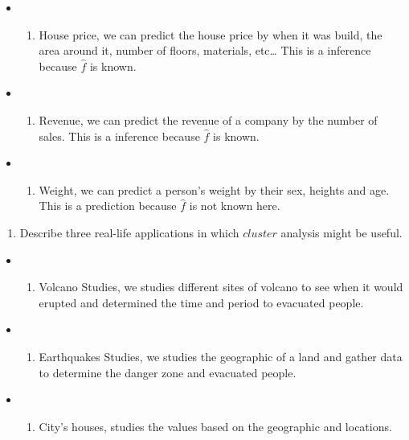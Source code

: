 \documentclass[
]{article}
\providecommand{\tightlist}{%
  \setlength{\itemsep}{0pt}\setlength{\parskip}{0pt}}
\begin{document}
\begin{itemize}
\item
  \begin{enumerate}
  \def\labelenumi{(\arabic{enumi})}
  \tightlist
  \item
    House price, we can predict the house price by when it was build,
    the area around it, number of floors, materials, etc\ldots{} This is
    a inference because \(\hat{f}\) is known.
  \end{enumerate}
\item
  \begin{enumerate}
  \def\labelenumi{(\arabic{enumi})}
  \setcounter{enumi}{1}
  \tightlist
  \item
    Revenue, we can predict the revenue of a company by the number of
    sales. This is a inference because \(\hat{f}\) is known.
  \end{enumerate}
\item
  \begin{enumerate}
  \def\labelenumi{(\arabic{enumi})}
  \setcounter{enumi}{2}
  \tightlist
  \item
    Weight, we can predict a person's weight by their sex, heights and
    age. This is a prediction because \(\hat{f}\) is not known here.
  \end{enumerate}
\end{itemize}

\begin{enumerate}
\def\labelenumi{(\alph{enumi})}
\setcounter{enumi}{2}
\tightlist
\item
  Describe three real-life applications in which \(cluster\) analysis
  might be useful.\\
\end{enumerate}

\begin{itemize}
\item
  \begin{enumerate}
  \def\labelenumi{(\arabic{enumi})}
  \tightlist
  \item
    Volcano Studies, we studies different sites of volcano to see when
    it would erupted and determined the time and period to evacuated
    people.
  \end{enumerate}
\item
  \begin{enumerate}
  \def\labelenumi{(\arabic{enumi})}
  \setcounter{enumi}{1}
  \tightlist
  \item
    Earthquakes Studies, we studies the geographic of a land and gather
    data to determine the danger zone and evacuated people.
  \end{enumerate}
\item
  \begin{enumerate}
  \def\labelenumi{(\arabic{enumi})}
  \setcounter{enumi}{2}
  \tightlist
  \item
    City's houses, studies the values based on the geographic and
    locations.
  \end{enumerate}
\end{itemize}
\end{document}
